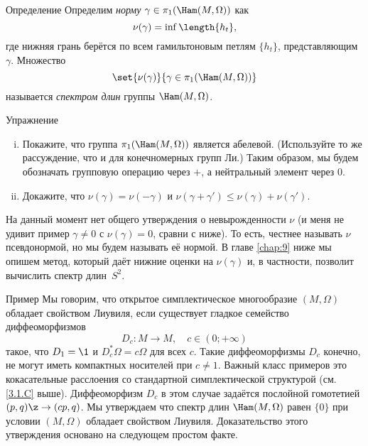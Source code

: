 \begin{thm}{Определение}\label{7.3.A}
Определим \emph{норму} $\gamma \in \pi_1 (\Ham (M, \Omega))$ как
\[\nu (\gamma) = \inf \length \{h_t\},\]
где нижняя грань берётся по всем гамильтоновым петлям $\{h_t\}$, представляющим $\gamma$.
Множество 
\[\set{\nu (\gamma)}{\gamma \in \pi_1 (\Ham (M, \Omega))}\]
называется \emph{спектром длин} группы $\Ham (M, \Omega)$.
\end{thm}

\begin{thm*}{Упражнение}

\begin{enumerate}[(i)]
 \item Покажите, что группа $\pi_1 (\Ham (M, \Omega))$ является абелевой. (Используйте то же рассуждение, что и для конечномерных групп Ли.)
Таким образом, мы будем обозначать групповую операцию через $+$, а нейтральный элемент через $0$.
 \item Докажите, что $\nu (\gamma) = \nu (-\gamma)$ и $\nu (\gamma + \gamma') \le \nu (\gamma) + \nu (\gamma')$.
\end{enumerate}

\end{thm*}

На данный момент нет общего утверждения о невырожденности $\nu$ (и меня не удивит пример $\gamma \ne 0$ с $\nu (\gamma) = 0$, сравни с
 ниже).
То есть, честнее называть $\nu$ псевдонормой, но мы будем называть её нормой.
В главе \ref{chap:9} ниже мы опишем метод, который даёт нижние оценки на $\nu (\gamma)$ и, в частности, позволит вычислить спектр длин~$S^2$.

\begin{thm}{Пример}\label{7.3.B}
Мы говорим, что открытое симплектическое многообразие $(M, \Omega)$ обладает свойством Лиувиля, если существует гладкое семейство диффеоморфизмов
\[D_c: M \to M,\quad c \in (0; + \infty)\]
такое, что $D_1 = \1$ и $D_c^\ast \Omega = c\Omega$ для всех $c$.
Такие диффеоморфизмы $D_c$ конечно, не могут иметь компактных носителей при $c \ne 1$.
Важный класс примеров это кокасательные расслоения со стандартной
симплектической структурой (см. \ref{3.1.C} выше).
Диффеоморфизм $D_c$ в этом случае задаётся послойной гомотетией $(p, q) \z\to (cp, q)$.
Мы утверждаем что спектр длин $\Ham (M, \Omega)$ равен $\{0\}$ при условии $(M, \Omega)$
обладает свойством Лиувиля.
Доказательство этого утверждения основано на следующем простом факте.
\end{thm}

